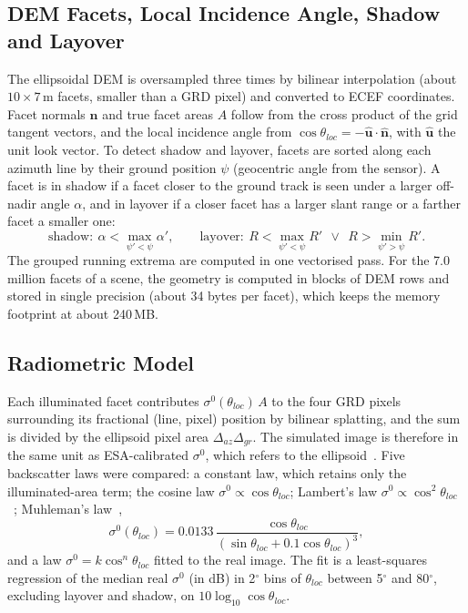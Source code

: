 \documentclass[10pt,a4paper]{article}
\newcommand{\sigz}{\sigma^0}
\begin{document}
\subsection{DEM Facets, Local Incidence Angle, Shadow and Layover}
The ellipsoidal DEM is oversampled three times by bilinear interpolation (about $10\times7$\,m facets, smaller than a GRD pixel) and converted to ECEF coordinates. Facet normals $\hat{\mathbf{n}}$ and true facet areas $A$ follow from the cross product of the grid tangent vectors, and the local incidence angle from $\cos\theta_{loc}=-\hat{\mathbf{u}}\cdot\hat{\mathbf{n}}$, with $\hat{\mathbf{u}}$ the unit look vector. To detect shadow and layover, facets are sorted along each azimuth line by their ground position $\psi$ (geocentric angle from the sensor). A facet is in shadow if a facet closer to the ground track is seen under a larger off-nadir angle $\alpha$, and in layover if a closer facet has a larger slant range or a farther facet a smaller one:
\begin{equation}
\mathrm{shadow}:\ \alpha<\max_{\psi'<\psi}\alpha',\qquad \mathrm{layover}:\ R<\max_{\psi'<\psi}R' \ \ \lor\ \ R>\min_{\psi'>\psi}R' .
\end{equation}
The grouped running extrema are computed in one vectorised pass. For the 7.0 million facets of a scene, the geometry is computed in blocks of DEM rows and stored in single precision (about 34 bytes per facet), which keeps the memory footprint at about 240\,MB.

\subsection{Radiometric Model}
Each illuminated facet contributes $\sigz(\theta_{loc})\,A$ to the four GRD pixels surrounding its fractional (line, pixel) position by bilinear splatting, and the sum is divided by the ellipsoid pixel area $\Delta_{az}\Delta_{gr}$. The simulated image is therefore in the same unit as ESA-calibrated $\sigz$, which refers to the ellipsoid~\cite{small2011}. Five backscatter laws were compared: a constant law, which retains only the illuminated-area term; the cosine law $\sigz\propto\cos\theta_{loc}$; Lambert's law $\sigz\propto\cos^2\theta_{loc}$~\cite{ulaby1982}; Muhleman's law~\cite{muhleman1964},
\begin{equation}
\sigz(\theta_{loc})=0.0133\,\frac{\cos\theta_{loc}}{\left(\sin\theta_{loc}+0.1\cos\theta_{loc}\right)^3},
\end{equation}
and a law $\sigz=k\cos^{n}\theta_{loc}$ fitted to the real image. The fit is a least-squares regression of the median real $\sigz$ (in dB) in 2$^\circ$ bins of $\theta_{loc}$ between 5$^\circ$ and 80$^\circ$, excluding layover and shadow, on $10\log_{10}\cos\theta_{loc}$.
\end{document}
